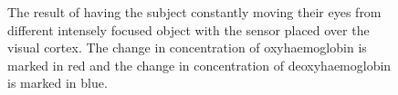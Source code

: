 \begin{figure}[htp]
\centering
{}
\caption[Visual Cortex Measurements while Moving Eyes between focused objects]{The result of having the subject constantly moving their eyes from different intensely focused object with the sensor placed over the visual cortex. The change in concentration of oxyhaemoglobin is marked in red and the change in concentration of deoxyhaemoglobin is marked in blue.}
\end{figure}

